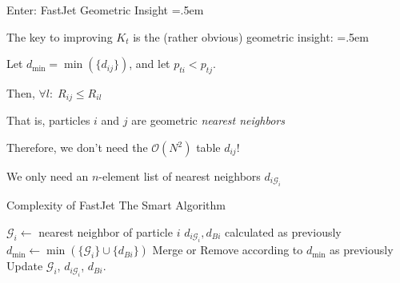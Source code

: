 \documentclass[xcolor={dvipsnames}]{beamer}
\let\olditemize=\itemize
\let\endolditemize=\enditemize
\renewenvironment{itemize}{\olditemize \itemsep=.5em }{\endolditemize}
\newcommand{\ord}[1]{\mathcal{O}(#1)}
\begin{document}
\begin{frame}{Enter: FastJet}
\alert{Geometric Insight}
\begin{itemize}
    \item<2-> The key to improving $K_t$ is the (rather obvious) geometric insight:
    \begin{itemize}
        \item<3-> Let $d_\text{min} = \min(\{d_{ij}\})$, and let $p_{ti} < p_{tj}$.
        \item<4-> Then, $\forall l:\;R_{ij} \leq R_{il} \quad$
    \end{itemize}
    \item<5-> That is, particles $i$ and $j$ are geometric \textit{nearest neighbors}
    \item<6-> Therefore, we don't need the $\ord{N^2}$ table $d_{ij}$!
    \item<7-> We only need an $n$-element list of nearest neighbors $d_{i\mathcal{G}_i}$
\end{itemize}
\end{frame}

\begin{frame}{Complexity of FastJet}
\alert{The Smart Algorithm}
\begin{algorithm}[H]
    \caption{\texttt{FastJet} $K_t$}
    \begin{algorithmic}[1]
            \State $\mathcal{G}_i \gets $ nearest neighbor of particle $i$
            \State $d_{i\mathcal{G}_i}, d_{Bi}$ calculated as previously
        \EndFor
        \Repeat
            \State $d_\text{min} \gets \min(\{\mathcal{G}_i\}\cup\{d_{Bi}\})$
            \State Merge or Remove according to $d_\text{min}$ as previously
            \State Update $\mathcal{G}_i$, $d_{i\mathcal{G}_i}$, $d_{Bi}$.
    \end{algorithmic}
\end{algorithm}
\end{frame}
\end{document}

